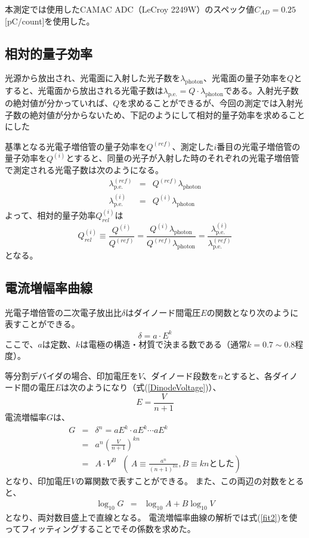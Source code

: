 \documentclass[11pt]{jreport}
\newcommand{\equref}[1]{式(\ref{#1})}
\newcommand{\photon}{\mathrm{photon}}
\newcommand{\pe}{\mathrm{p.e.}}
\begin{document}
本測定では使用したCAMAC ADC（LeCroy 2249W）のスペック値$C_{AD}=0.25$ [pC/count]を使用した。

\subsection{相対的量子効率}
光源から放出され、光電面に入射した光子数を$\lambda_{\photon}$、光電面の量子効率を$Q$とすると、光電面から放出される光電子数は$\lambda_{\pe}=Q \cdot \lambda_{\photon}$である。入射光子数の絶対値が分かっていれば、$Q$を求めることができるが、今回の測定では入射光子数の絶対値が分からないため、下記のようにして相対的量子効率を求めることにした

基準となる光電子増倍管の量子効率を$Q^{(ref)}$、測定した$i$番目の光電子増倍管の量子効率を$Q^{(i)}$とすると、同量の光子が入射した時のそれぞれの光電子増倍管で測定される光電子数は次のようになる。
\begin{eqnarray}
\lambda_{\pe}^{(ref)} & =  & Q^{(ref)}\lambda_{\photon}\\
\lambda_{\pe}^{(i)} & = & Q^{(i)}\lambda_{\photon}
\end{eqnarray}
よって、相対的量子効率$Q_{rel}^{(i)}$は
\begin{equation}
Q_{rel}^{(i)} \equiv \frac{Q^{(i)}}{Q^{(ref)}}%
 = \frac{Q^{(i)}\lambda_{\photon}}{Q^{(ref)}\lambda_{\photon}} %
 = \frac{\lambda_{\pe}^{(i)}}{\lambda_{\pe}^{(ref)}}%
\end{equation}
となる。


\subsection{電流増幅率曲線}
光電子増倍管の二次電子放出比$\delta$はダイノード間電圧$E$の関数となり次のように表すことができる。
\begin{equation}
\delta = a \cdot E^{k}
\label{SecPEratio}
\end{equation}
ここで、$a$は定数、$k$は電極の構造・材質で決まる数である（通常$k=0.7\sim0.8$程度）。

等分割デバイダの場合、印加電圧を$V$、ダイノード段数を$n$とすると、各ダイノード間の電圧$E$は次のようになり（\equref{DinodeVoltage}）、
\begin{equation}
E=\frac{V}{n+1}
\label{DinodeVoltage}
\end{equation}
電流増幅率$G$は、
\begin{eqnarray}
G & = &  \delta^{n} = aE^{k} \cdot aE^{k} \cdots aE^{k}  \nonumber \\
& = & a^{n} \left(\frac{V}{n+1}\right)^{kn}  \nonumber \\
& = & A \cdot V^{B}
\ \ \ \left(\ A \equiv \frac{a^{n}}{(n+1)^{kn}}, B\equiv kn  \text{とした}\right) \label{fit1}
\end{eqnarray}
となり、印加電圧$V$の冪関数で表すことができる。
また、この両辺の対数をとると、
\begin{eqnarray}
\log_{10}G & = & \log_{10}A + B \log_{10}V \label{fit2}
\end{eqnarray}
となり、両対数目盛上で直線となる。
電流増幅率曲線の解析では\equref{fit2}を使ってフィッティングすることでその係数を求めた。
\end{document}
